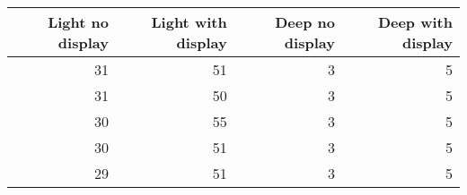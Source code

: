 \begin{tabular}{rrrr}
\toprule
 Light no display &  Light with display &  Deep no display &  Deep with display \\
\midrule
               31 &                  51 &                3 &                  5 \\
               31 &                  50 &                3 &                  5 \\
               30 &                  55 &                3 &                  5 \\
               30 &                  51 &                3 &                  5 \\
               29 &                  51 &                3 &                  5 \\
\bottomrule
\end{tabular}
